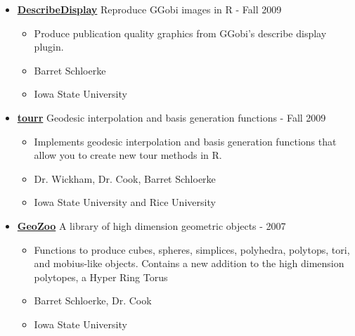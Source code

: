 \documentclass[oneside]{article}
\begin{document}
\begin{itemize}
      \item{\bf \href{http://github.com/ggobi/DescribeDisplay}{DescribeDisplay}} Reproduce GGobi images in R - Fall 2009
        \begin{itemize}
          \item Produce publication quality graphics from GGobi's describe display plugin.
          \item Barret Schloerke
          \item Iowa State University
        \end{itemize}


      \item{\bf \href{http://github.com/ggobi/tourr}{tourr}} Geodesic interpolation and basis generation functions - Fall 2009
        \begin{itemize}
          \item Implements geodesic interpolation and basis generation functions that allow you to create new tour methods in R.
          \item Dr. Wickham, Dr. Cook, Barret Schloerke
          \item Iowa State University and Rice University
        \end{itemize}


      \item{\bf \href{http://streaming.stat.iastate.edu/~dicook/geometric-data/}{GeoZoo}} A library of high dimension geometric objects - 2007
        \begin{itemize}
          \item Functions to produce cubes, spheres, simplices, polyhedra, polytops, tori, and mobius-like objects. Contains a new addition to the high dimension polytopes, a Hyper Ring Torus
          \item Barret Schloerke, Dr. Cook
          \item Iowa State University
        \end{itemize}



\end{itemize}
\end{document}
